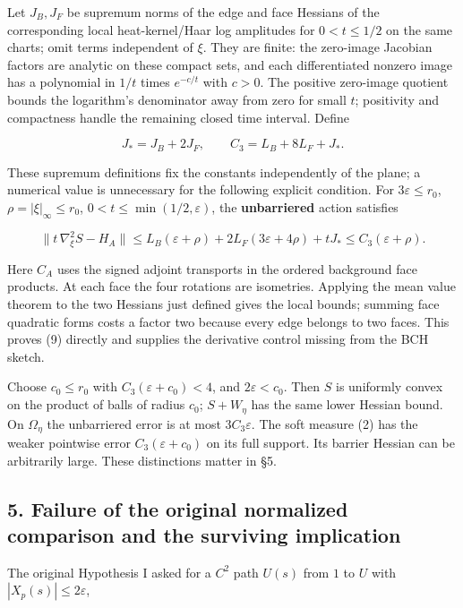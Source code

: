 \documentclass[11pt,a4paper]{article}
\begin{document}
Let \(J_B,J_F\) be supremum norms of the edge and face Hessians of the
corresponding local heat-kernel/Haar log amplitudes for \(0<t\le1/2\) on
the same charts; omit terms independent of \(\xi\). They are finite: the
zero-image Jacobian factors are analytic on these compact sets, and each
differentiated nonzero image has a polynomial in \(1/t\) times
\(e^{-c/t}\) with \(c>0\). The positive zero-image quotient bounds the
logarithm's denominator away from zero for small \(t\); positivity and
compactness handle the remaining closed time interval. Define

\[J_* = J_B+2J_F,\qquad C_3=L_B+8L_F+J_* .\tag{8}\]

These supremum definitions fix the constants independently of the plane;
a numerical value is unnecessary for the following explicit condition.
For \(3\varepsilon\le r_0\), \(\rho=|\xi|_\infty\le r_0\),
\(0<t\le\min(1/2,\varepsilon)\), the \textbf{unbarriered} action
satisfies

\[\|t\,\nabla_\xi^2S-H_A\|
\le L_B(\varepsilon+\rho)+2L_F(3\varepsilon+4\rho)+tJ_*
\le C_3(\varepsilon+\rho).\tag{9}\]

Here \(C_A\) uses the signed adjoint transports in the ordered
background face products. At each face the four rotations are
isometries. Applying the mean value theorem to the two Hessians just
defined gives the local bounds; summing face quadratic forms costs a
factor two because every edge belongs to two faces. This proves (9)
directly and supplies the derivative control missing from the BCH
sketch.

Choose \(c_0\le r_0\) with \(C_3(\varepsilon+c_0)<4\), and
\(2\varepsilon<c_0\). Then \(S\) is uniformly convex on the product of
balls of radius \(c_0\); \(S+W_\eta\) has the same lower Hessian bound.
On \(\Omega_\eta\) the unbarriered error is at most \(3C_3\varepsilon\).
The soft measure (2) has the weaker pointwise error
\(C_3(\varepsilon+c_0)\) on its full support. Its barrier Hessian can be
arbitrarily large. These distinctions matter in §5.

\hypertarget{failure-of-the-original-normalized-comparison-and-the-surviving-implication}{%
\subsection{5. Failure of the original normalized comparison and the
surviving
implication}\label{failure-of-the-original-normalized-comparison-and-the-surviving-implication}}

The original Hypothesis I asked for a \(C^2\) path \(U(s)\) from \(1\)
to \(U\) with \(|X_p(s)|\le2\varepsilon\),
\end{document}
